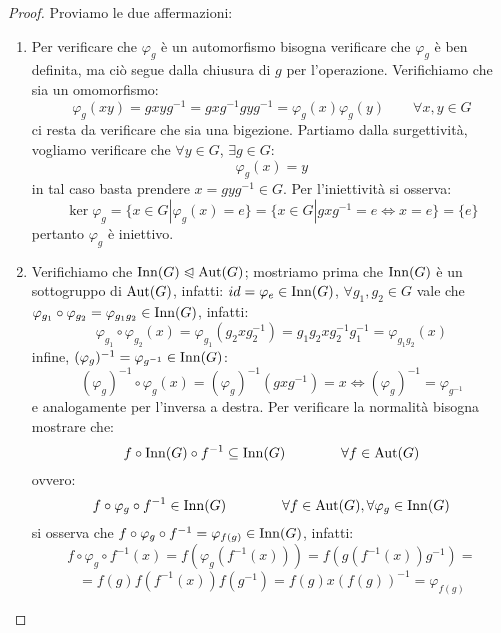 \documentclass[11pt]{scrartcl}
\begin{document}
\begin{proof}
    Proviamo le due affermazioni:
        \begin{enumerate}[(1)]
            \item Per verificare che $\varphi_g$ è un automorfismo bisogna verificare che $\varphi_g$ è ben definita, ma ciò segue dalla chiusura di $g$ per l'operazione.
                Verifichiamo che sia un omomorfismo:
                    \[ \varphi_g(xy) = gxyg^{-1} = gxg^{-1}gyg^{-1} = \varphi_g(x)\varphi_g(y)
                    \qquad \forall x,y \in G 
                        \]
                ci resta da verificare che sia una bigezione. Partiamo dalla surgettività, vogliamo verificare che $\forall y \in G$, $\exists g \in G :$
                    \[ \varphi_g(x) = y
                        \]
                in tal caso basta prendere $x = gyg^{-1} \in G$. Per l'iniettività si osserva:
                    \[ \ker \varphi_g = \{x \in G | \varphi_g(x) = e\} = \{x \in G | gxg^{-1} = e \iff x = e\} = \{e\}
                        \]
                pertanto $\varphi_g$ è iniettivo.
            \item Verifichiamo che $\operatorname{Inn}(G) \trianglelefteqslant \operatorname{Aut}(G)$; mostriamo prima che $\operatorname{Inn}(G)$ è un sottogruppo di $\operatorname{Aut}(G)$, infatti: 
            $id = \varphi_e \in \operatorname{Inn}(G)$, $\forall g_1,g_2 \in G$ vale che $\varphi_{g_{1}} \circ \varphi_{g_{2}} = \varphi_{g_1g_2} \in \operatorname{Inn}(G)$, infatti:
                    \[ \varphi_{g_{1}} \circ \varphi_{g_{2}}(x) = \varphi_{g_{1}}(g_2xg_2^{-1}) = g_1g_2xg_2^{-1}g_1^{-1} = \varphi_{g_1g_2}(x)
                        \]
                infine, $(\varphi_{g})^{-1} = \varphi_{g^{-1}} \in \operatorname{Inn}(G)$:
                    \[ (\varphi_{g})^{-1} \circ \varphi_{g}(x) = (\varphi_{g})^{-1} (gxg^{-1}) = x \iff (\varphi_{g})^{-1} = \varphi_{g^{-1}}
                        \]
                e analogamente per l'inversa a destra. Per verificare la normalità bisogna mostrare che:
                    \[ f \circ \operatorname{Inn}(G) \circ f^{-1} \subseteq \operatorname{Inn}(G)
                    \qquad \qquad \forall f \in \operatorname{Aut}(G)
                        \]
                ovvero:
                    \[ f \circ \varphi_g \circ f^{-1} \in \operatorname{Inn}(G)
                    \qquad \qquad \forall f \in \operatorname{Aut}(G), \forall \varphi_g \in \operatorname{Inn}(G)
                        \]
                si osserva che $f \circ \varphi_g \circ f^{-1} = \varphi_{f(g)} \in \operatorname{Inn}(G)$, infatti:
                    \[ f \circ \varphi_g \circ f^{-1} (x) = f(\varphi_g(f^{-1} (x))) = f(g(f^{-1}(x))g^{-1}) =
                        \]\[ = f(g) f(f^{-1}(x)) f(g^{-1}) = f(g) x (f(g))^{-1} = \varphi_{f(g)}
                            \]
        \end{enumerate}
\end{proof}
\end{document}

